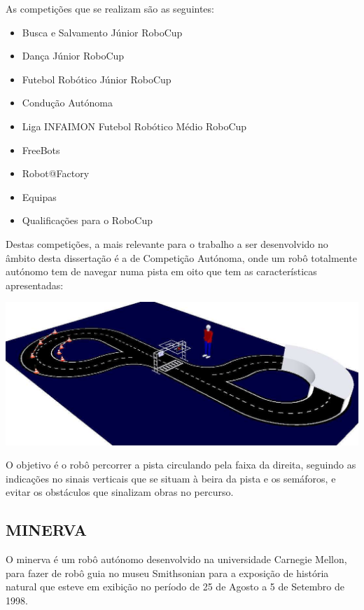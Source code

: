 As competições que se realizam são as seguintes:
\begin{itemize}
\item    Busca e Salvamento Júnior RoboCup
\item    Dança Júnior RoboCup
\item    Futebol Robótico Júnior RoboCup
\item    Condução Autónoma
\item    Liga INFAIMON Futebol Robótico Médio RoboCup
\item    FreeBots
\item    Robot@Factory
\item    Equipas
\item    Qualificações para o RoboCup
\end{itemize}

Destas competições, a mais relevante para o trabalho a ser desenvolvido no 
âmbito desta dissertação é a de Competição Autónoma, onde um robô totalmente 
autónomo tem de navegar numa pista em oito que tem as características apresentadas:

\begin{center}
	\includegraphics[width=1.00\textwidth]{./figures/ca_pista.png}
	\label{fig:3}
\end{center}

O objetivo é o robô percorrer a pista circulando pela faixa da direita, seguindo
as indicações no sinais verticais que se situam à beira da pista e os semáforos,
e evitar os obstáculos que sinalizam obras no percurso.


\subsection{MINERVA}
O minerva é um robô autónomo desenvolvido na universidade Carnegie Mellon, para
fazer de robô guia no museu Smithsonian para a exposição de história natural que esteve em exibição no período de 25 de Agosto a 5 de Setembro de 1998.

